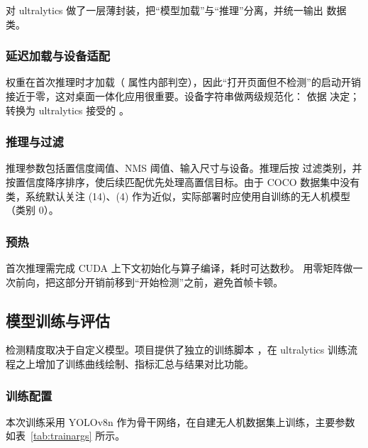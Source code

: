  对 ultralytics 做了一层薄封装，把“模型加载”与“推理”分离，并统一输出  数据类。

\subsubsection{延迟加载与设备适配}

权重在首次推理时才加载（ 属性内部判空），因此“打开页面但不检测”的启动开销接近于零，这对桌面一体化应用很重要。设备字符串做两级规范化： 依据  决定； 转换为 ultralytics 接受的 。

\subsubsection{推理与过滤}

推理参数包括置信度阈值、NMS 阈值、输入尺寸与设备。推理后按  过滤类别，并按置信度降序排序，使后续匹配优先处理高置信目标。由于 COCO 数据集中没有  类，系统默认关注 (14)、(4) 作为近似，实际部署时应使用自训练的无人机模型（类别 0）。

\subsubsection{预热}

首次推理需完成 CUDA 上下文初始化与算子编译，耗时可达数秒。 用零矩阵做一次前向，把这部分开销前移到“开始检测”之前，避免首帧卡顿。

\subsection{模型训练与评估}

检测精度取决于自定义模型。项目提供了独立的训练脚本 ，在 ultralytics 训练流程之上增加了训练曲线绘制、指标汇总与结果对比功能。

\subsubsection{训练配置}

本次训练采用 YOLOv8n 作为骨干网络，在自建无人机数据集上训练，主要参数如表~\ref{tab:trainargs} 所示。

